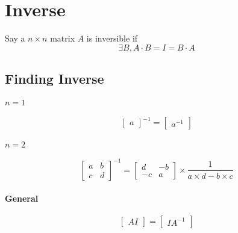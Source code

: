 \section{Inverse}

\begin{definition}
  Say a $ n \times n $ matrix $ A $ is inversible if 
  \begin{displaymath}
    \exists B, A \cdot B = I = B \cdot A
  \end{displaymath}
\end{definition}

\subsection{Finding Inverse}

  \paragraph{$ n = 1 $}
  \begin{equation}
    \begin{bmatrix}
      a
    \end{bmatrix}^{-1}
    =
    \begin{bmatrix}
      a^{-1}
    \end{bmatrix}
  \end{equation}
  
  \paragraph{$ n = 2 $}
  \begin{equation}
    \begin{bmatrix}
      a & b \\ 
      c & d
    \end{bmatrix}^{-1}
    =
    \begin{bmatrix}
      d & -b \\ 
      -c & a
    \end{bmatrix}
    \times \frac{1}{a \times d - b \times c}
  \end{equation}
  
  \paragraph{General}
  \begin{equation}
    \begin{bmatrix}
      A I
    \end{bmatrix}
    =
    \begin{bmatrix}
      I A^{-1}
    \end{bmatrix}
  \end{equation}

